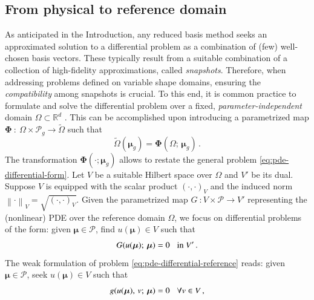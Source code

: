 \documentclass{elsarticle}
\numberwithin{equation}{section}
\theoremstyle{theorem}
\theoremstyle{definition}
\theoremstyle{remark}
\theoremstyle{proposition}
\numberwithin{figure}{section}
\newcommand{\norm}[1]{\left\lVert#1\right\rVert}
\newcommand{\wt}[1]{\widetilde{#1}}
\newcommand{\bg}[1]{\boldsymbol{#1}}
\begin{document}
		
		
	\subsection{From physical to reference domain}
	\label{section:From physical to reference domain}
	
		As anticipated in the Introduction, any reduced basis method seeks an approximated solution to a differential problem as a combination of (few) well-chosen basis vectors. These typically result from a suitable combination of a collection of high-fidelity approximations, called \emph{snapshots}. Therefore, when addressing problems defined on variable shape domains, ensuring the \emph{compatibility} among snapshots is crucial. To this end, it is common practice to formulate and solve the differential problem over a fixed, \emph{parameter-independent} domain $\Omega \subset \mathbb{R}^d$ \cite{MN16}. This can be accomplished upon introducing a parametrized map $\bg{\Phi} ~ : ~ \Omega \times \mathcal{P}_g \rightarrow \wt{\Omega}$ such that
		\begin{equation*}
			\label{eq:parametrized-map}
			\wt{\Omega}(\bg{\mu}_g) = \bg{\Phi}(\Omega; \, \bg{\mu}_g) \, .
		\end{equation*}
		The transformation $\bg{\Phi}(\cdot; \bg{\mu}_g)$ allows to restate the general problem \eqref{eq:pde-differential-form}. Let $V$ be a suitable Hilbert space over $\Omega$ and $V'$ be its dual. Suppose $V$ is equipped with the scalar product $(\cdot, \cdot)_V$ and the induced norm $\norm{\cdot}_V = \sqrt{(\cdot, \cdot)_V}$. Given the parametrized map $G ~ : V \times \mathcal{P} \rightarrow V'$ representing the (nonlinear) PDE over the reference domain $\Omega$, we focus on differential problems of the form: given $\bg{\mu} \in \mathcal{P}$, find $u(\bg{\mu}) \in V$ such that
		\begin{equation}
			\label{eq:pde-differential-reference}
			G(u(\bg{\mu}); \, \bg{\mu}) = 0 \hspace*{0.3cm} \text{in $V'$} \, .
		\end{equation}
		The weak formulation of problem \eqref{eq:pde-differential-reference} reads: given $\bg{\mu} \in \mathcal{P}$, seek $u(\bg{\mu}) \in V$ such that
		\begin{equation}
			\label{eq:pde-weak-reference}
			g(u(\bg{\mu}), \, v; \, \bg{\mu}) = 0 \hspace*{0.3cm} \forall v \in V \, ,
		\end{equation}
\end{document}
